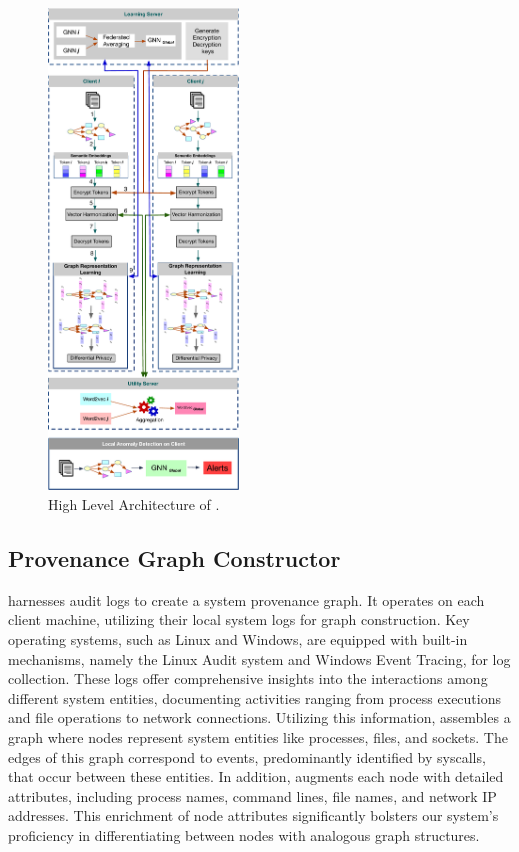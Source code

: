 \begin{figure}[t!]
  \centering
  \includegraphics[width=0.45\textwidth]{fig/arch.pdf}
  \caption{High Level Architecture of \Sys.}
  \vspace{-3ex}
  \label{fig:arch}
\end{figure}

\subsection{Provenance Graph Constructor} 
\Sys harnesses audit logs to create a system provenance graph. It operates on each client machine, utilizing their local system logs for graph construction. Key operating systems, such as Linux and Windows, are equipped with built-in mechanisms, namely the Linux Audit system and Windows Event Tracing, for log collection. These logs offer comprehensive insights into the interactions among different system entities, documenting activities ranging from process executions and file operations to network connections. Utilizing this information, \Sys assembles a graph where nodes represent system entities like processes, files, and sockets. The edges of this graph correspond to events, predominantly identified by syscalls, that occur between these entities. In addition, \Sys augments each node with detailed attributes, including process names, command lines, file names, and network IP addresses. This enrichment of node attributes significantly bolsters our system's proficiency in differentiating between nodes with analogous graph structures.

